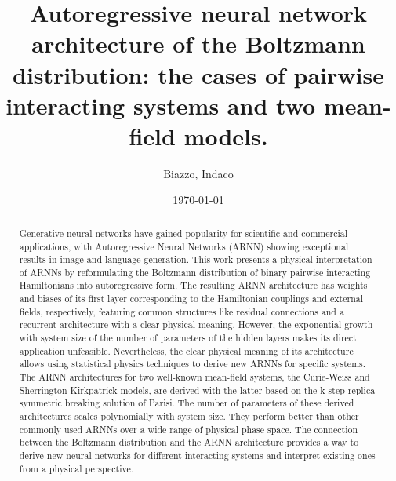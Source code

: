 \documentclass[aps,physrev,10pt,floatfix,reprint]{revtex4-2}
\begin{document}
\title{Autoregressive neural network architecture of the Boltzmann distribution: the cases of pairwise interacting systems and two mean-field models.}
\author{Biazzo, Indaco}
\date{\today}

\begin{abstract}
Generative neural networks have gained popularity for scientific and commercial applications, with Autoregressive Neural Networks (ARNN) showing exceptional results in image and language generation. This work presents a physical interpretation of ARNNs by reformulating the Boltzmann distribution of binary pairwise interacting Hamiltonians into autoregressive form. The resulting ARNN architecture has weights and biases of its first layer corresponding to the Hamiltonian couplings and external fields, respectively, featuring common structures like residual connections and a recurrent architecture with a clear physical meaning. However, the exponential growth with system size of the number of parameters of the hidden layers makes its direct application unfeasible. Nevertheless, the clear physical meaning of its architecture allows using statistical physics techniques to derive new ARNNs for specific systems. The ARNN architectures for two well-known mean-field systems, the Curie-Weiss and Sherrington-Kirkpatrick models, are derived with the latter based on the k-step replica symmetric breaking solution of Parisi. The number of parameters of these derived architectures scales polynomially with system size. They perform better than other commonly used ARNNs over a wide range of physical phase space. The connection between the Boltzmann distribution and the ARNN architecture provides a way to derive new neural networks for different interacting systems and interpret existing ones from a physical perspective.


\end{abstract}
\end{document}

